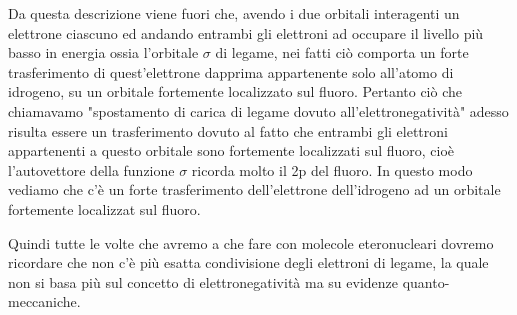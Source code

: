 Da questa descrizione viene fuori che, avendo i due orbitali interagenti un elettrone ciascuno ed andando entrambi gli elettroni ad occupare il livello più basso in energia ossia l'orbitale $\sigma$ di legame, nei fatti ciò comporta un forte trasferimento di quest'elettrone dapprima appartenente solo all'atomo di idrogeno, su un orbitale fortemente localizzato sul fluoro. Pertanto ciò che chiamavamo "spostamento di carica di legame dovuto all'elettronegatività" adesso risulta essere un trasferimento dovuto al fatto che entrambi gli elettroni appartenenti a questo orbitale sono fortemente localizzati sul fluoro, cioè l'autovettore della funzione $\sigma$ ricorda molto il 2p del fluoro. In questo modo vediamo che c'è un forte trasferimento dell'elettrone dell'idrogeno ad un orbitale fortemente localizzat sul fluoro.

Quindi tutte le volte che avremo a che fare con molecole eteronucleari dovremo ricordare che non c'è più esatta condivisione degli elettroni di legame, la quale non si basa più sul concetto di elettronegatività ma su evidenze quanto-meccaniche.

